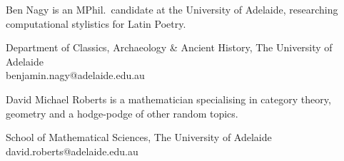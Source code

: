 \documentclass{article}
\theoremstyle{plain}
\theoremstyle{definition}
\begin{document}
\begin{biog}
\item[Ben Nagy] is an MPhil.\ candidate at the University of Adelaide, researching computational stylistics for Latin Poetry.
\begin{affil}
Department of Classics, Archaeology \& Ancient History, The University of Adelaide\\
benjamin.nagy@adelaide.edu.au
\end{affil}

\item[David Michael Roberts] is a mathematician specialising in category theory, geometry and a hodge-podge of other random topics.
\begin{affil}
School of Mathematical Sciences, The University of Adelaide\\
david.roberts@adelaide.edu.au
\end{affil}
\end{biog}
\vfill\eject
\end{document}
